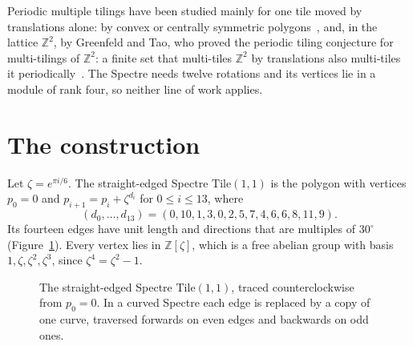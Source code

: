 \documentclass[11pt]{amsart}
\theoremstyle{remark}
\newcommand{\Z}{\mathbb Z}
\begin{document}
Periodic multiple tilings have been studied mainly for one tile moved by translations alone:
by convex or centrally symmetric polygons~\cite{Kol,GRS}, and, in the lattice $\Z^2$, by Greenfeld and
Tao, who proved the periodic tiling conjecture for multi-tilings of $\Z^2$: a finite set that
multi-tiles $\Z^2$ by translations also multi-tiles it periodically~\cite{GT}. The Spectre needs twelve rotations and its vertices lie in a
module of rank four, so neither line of work applies.

\section{The construction}

Let $\zeta=e^{\pi i/6}$. The straight-edged Spectre $\mathrm{Tile}(1,1)$ is the polygon with vertices
$p_0=0$ and $p_{i+1}=p_i+\zeta^{d_i}$ for $0\le i\le13$, where
\[
(d_0,\dots,d_{13})=(0,10,1,3,0,2,5,7,4,6,6,8,11,9).
\]
Its fourteen edges have unit length and directions that are multiples of $30^\circ$
(Figure~\ref{fig:tile}). Every vertex lies in $\Z[\zeta]$, which is a free abelian group with basis
$1,\zeta,\zeta^2,\zeta^3$, since $\zeta^4=\zeta^2-1$.

\begin{figure}[ht]
\centering
{}
\caption{The straight-edged Spectre $\mathrm{Tile}(1,1)$, traced counterclockwise from $p_0=0$. In a curved
Spectre each edge is replaced by a copy of one curve, traversed forwards on even edges and backwards on odd
ones.}\label{fig:tile}
\end{figure}
\end{document}
